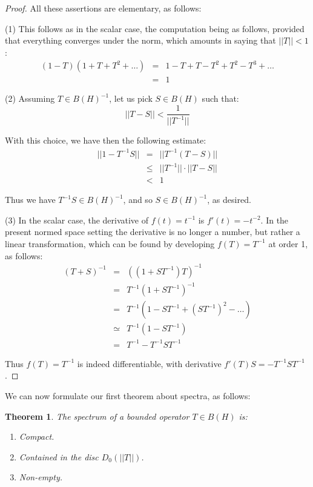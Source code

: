 \documentclass[12pt]{amsbook}
\newtheorem{theorem}{Theorem}[chapter]
\begin{document}
\begin{proof}
All these assertions are elementary, as follows:

\medskip

(1) This follows as in the scalar case, the computation being as follows, provided that everything converges under the norm, which amounts in saying that $||T||<1$:
\begin{eqnarray*}
(1-T)(1+T+T^2+\ldots)
&=&1-T+T-T^2+T^2-T^3+\ldots\\
&=&1
\end{eqnarray*}

(2) Assuming $T\in B(H)^{-1}$, let us pick $S\in B(H)$ such that:
$$||T-S||<\frac{1}{||T^{-1}||}$$

With this choice, we have then the following estimate:
\begin{eqnarray*}
||1-T^{-1}S||
&=&||T^{-1}(T-S)||\\
&\leq&||T^{-1}||\cdot||T-S||\\
&<&1
\end{eqnarray*}

Thus we have $T^{-1}S\in B(H)^{-1}$, and so $S\in B(H)^{-1}$, as desired.

\medskip

(3) In the scalar case, the derivative of $f(t)=t^{-1}$ is $f'(t)=-t^{-2}$. In the present normed space setting the derivative is no longer a number, but rather a linear transformation, which can be found by developing $f(T)=T^{-1}$ at order 1, as follows:
\begin{eqnarray*}
(T+S)^{-1}
&=&((1+ST^{-1})T)^{-1}\\
&=&T^{-1}(1+ST^{-1})^{-1}\\
&=&T^{-1}(1-ST^{-1}+(ST^{-1})^2-\ldots)\\
&\simeq&T^{-1}(1-ST^{-1})\\
&=&T^{-1}-T^{-1}ST^{-1}
\end{eqnarray*}

Thus $f(T)=T^{-1}$ is indeed differentiable, with derivative $f'(T)S=-T^{-1}ST^{-1}$.
\end{proof}

We can now formulate our first theorem about spectra, as follows:


\begin{theorem}
The spectrum of a bounded operator $T\in B(H)$ is:
\begin{enumerate}
\item Compact.

\item Contained in the disc $D_0(||T||)$.

\item Non-empty.
\end{enumerate}
\end{theorem}
\end{document}
